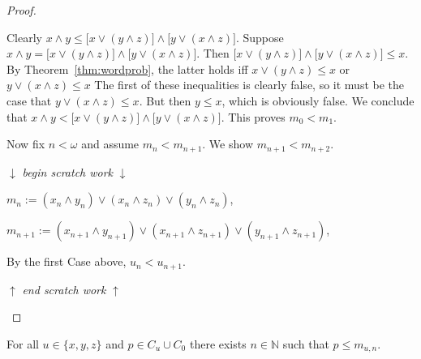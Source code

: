 \begin{proof}
\begin{itemize}
  Clearly 
  $x\wedge y \leqslant \bigl[x \vee (y\wedge z)\bigr]\wedge \bigl[y \vee (x\wedge z)\bigr]$. 
  Suppose 
  $x\wedge y = \bigl[x \vee (y\wedge z)\bigr]\wedge \bigl[y \vee (x\wedge z)\bigr]$. 
  Then $\bigl[x \vee (y\wedge z)\bigr]\wedge \bigl[y \vee (x\wedge z)\bigr]\leqslant x$.
  By Theorem~\ref{thm:wordprob}, the latter holds iff
  $x \vee (y\wedge z)\leqslant x$ or
  $y \vee (x\wedge z)\leqslant x$
  The first of these inequalities is clearly false, so it must be the case that 
  $y \vee (x\wedge z)\leqslant x$.  But then $y \leqslant x$, which is obviously false.  
  We conclude that
  $x\wedge y < \bigl[x \vee (y\wedge z)\bigr]\wedge \bigl[y \vee (x\wedge z)\bigr]$.
  This proves $m_0 < m_1$.

  Now fix $n < \omega$ and assume $m_n < m_{n+1}$.
  We show $m_{n+1} < m_{n+2}$.

\medskip
  $\downarrow$ \textit{begin scratch work} $\downarrow$

  $m_{n} := (x_n \wedge y_n) \vee (x_n \wedge z_n)\vee (y_n \wedge z_n)$,

  $m_{n+1} := (x_{n+1} \wedge y_{n+1}) \vee (x_{n+1} \wedge z_{n+1})\vee (y_{n+1} \wedge z_{n+1})$,

  By the first Case above, $u_n < u_{n+1}$.
  
  $\uparrow$ \textit{end scratch work} $\uparrow$
\end{itemize}
\end{proof}


\begin{lemma}\label{lem:2} %
For all $u \in \{x, y, z\}$ and $p \in C_u \cup C_0$ there exists $n \in \mathbb N$ such that $p\leqslant m_{u,n}$.  
\end{lemma}

